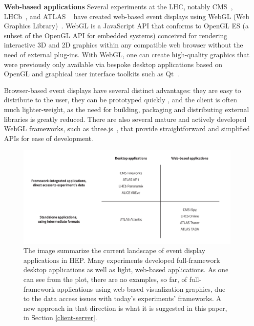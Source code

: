 \documentclass[12pt,a4paper]{article}
\begin{document}
{\bf Web-based applications} Several experiments at the LHC, notably CMS~\cite{CMSISpyWebGL}, LHCb~\cite{LHCbOnline2014}, and ATLAS
~\cite{ATLASTada2016, ATLASTracer2015} have created web-based event displays using WebGL (Web Graphics Library)~\cite{WebGL2011}.
WebGL is a JavaScript API that conforms to OpenGL ES (a subset of the OpenGL API for embedded systems) conceived for
rendering interactive 3D and 2D graphics within any compatible web browser without the need of external plug-ins. With WebGL,
one can create high-quality graphics that were previously only available via bespoke desktop applications based on OpenGL and
graphical user interface toolkits such as Qt~\cite{QtFramework}.

Browser-based event displays have several distinct advantages: they are easy to distribute to the user, they can be prototyped quickly
, and the client is often much lighter-weight, as the need for building, packaging and distributing external libraries is greatly reduced.
There are also several mature and actively developed WebGL frameworks, such as three.js~\cite{ThreeJS}, that provide straightforward
and simplified APIs for ease of development.


\begin{figure}
	\centering
	\includegraphics[width=0.95\linewidth]{img/Current_Visualization_Landscape_v3}
	\caption[Current landscape of event display applications in HEP]{The image summarize the current landscape of event display applications in HEP. Many experiments developed full-framework desktop applications as well as light, web-based applications. As one can see from the plot, there are no examples, so far, of full-framework applications using web-based visualization graphics, due to the data access issues with today's experiments' frameworks. A new approach in that direction is what it is suggested in this paper, in Section \ref{client-server}.}
	\label{fig:currentvisualizationlandscape}
\end{figure}
\end{document}
